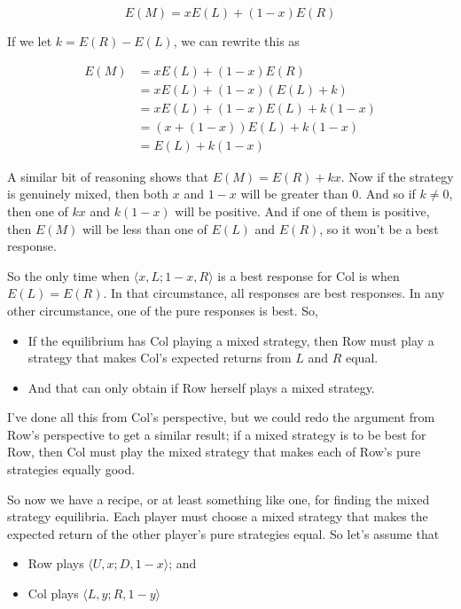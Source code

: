 \documentclass[
  11pt,
  letterpaper,
]{scrbook}
\providecommand{\tightlist}{%
  \setlength{\itemsep}{0pt}\setlength{\parskip}{0pt}}
\begin{document}
\begin{equation*}
E(M) = xE(L) + (1-x)E(R)
\end{equation*}

If we let \(k = E(R) - E(L)\), we can rewrite this as

\begin{align*}
E(M) &= xE(L) + (1-x)E(R) \\
&= xE(L) + (1-x)(E(L) + k) \\
&= xE(L) + (1-x)E(L) + k(1-x) \\
&= (x + (1-x))E(L) + k(1-x) \\
&= E(L) + k(1-x)
\end{align*}

A similar bit of reasoning shows that \(E(M) = E(R) + kx\). Now if the
strategy is genuinely mixed, then both \(x\) and \(1-x\) will be greater
than 0. And so if \(k \neq 0\), then one of \(kx\) and \(k(1-x)\) will
be positive. And if one of them is positive, then \(E(M)\) will be less
than one of \(E(L)\) and \(E(R)\), so it won't be a best response.

So the only time when \(\langle x, L; 1-x, R\rangle\) is a best response
for Col is when \(E(L) = E(R)\). In that circumstance, all responses are
best responses. In any other circumstance, one of the pure responses is
best. So,

\begin{itemize}
\tightlist
\item
  If the equilibrium has Col playing a mixed strategy, then Row must
  play a strategy that makes Col's expected returns from \(L\) and \(R\)
  equal.
\item
  And that can only obtain if Row herself plays a mixed strategy.
\end{itemize}

I've done all this from Col's perspective, but we could redo the
argument from Row's perspective to get a similar result; if a mixed
strategy is to be best for Row, then Col must play the mixed strategy
that makes each of Row's pure strategies equally good.

So now we have a recipe, or at least something like one, for finding the
mixed strategy equilibria. Each player must choose a mixed strategy that
makes the expected return of the other player's pure strategies equal.
So let's assume that

\begin{itemize}
\tightlist
\item
  Row plays \(\langle U, x; D, 1-x \rangle\); and
\item
  Col plays \(\langle L, y; R, 1-y \rangle\)
\end{itemize}
\end{document}
